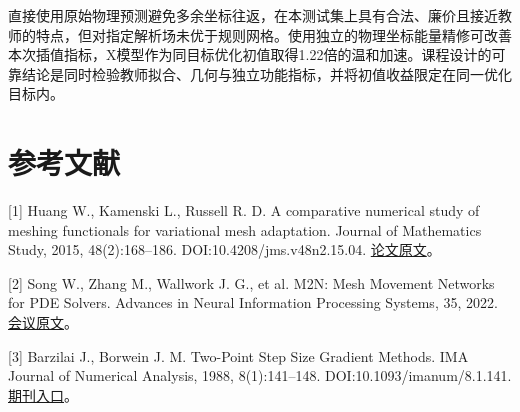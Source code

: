 \documentclass[UTF8,a4paper,zihao=5,fontset=fandol]{ctexart}
\begin{document}
直接使用原始物理预测避免多余坐标往返，在本测试集上具有合法、廉价且接近教师的特点，但对指定解析场未优于规则网格。使用独立的物理坐标能量精修可改善本次插值指标，X模型作为同目标优化初值取得1.22倍的温和加速。课程设计的可靠结论是同时检验教师拟合、几何与独立功能指标，并将初值收益限定在同一优化目标内。


\section*{参考文献}

\begin{sloppypar}[1] Huang W., Kamenski L., Russell R. D. A comparative numerical study of meshing functionals for variational mesh adaptation. Journal of Mathematics Study, 2015, 48(2):168–186. DOI:10.4208/jms.v48n2.15.04. \href{https://arxiv.org/abs/1503.04709}{论文原文}。\end{sloppypar}


\begin{sloppypar}[2] Song W., Zhang M., Wallwork J. G., et al. M2N: Mesh Movement Networks for PDE Solvers. Advances in Neural Information Processing Systems, 35, 2022. \href{https://proceedings.neurips.cc/paper\_files/paper/2022/hash/2f88d8061f12abae9d14d376fd69c933-Abstract-Conference.html}{会议原文}。\end{sloppypar}


\begin{sloppypar}[3] Barzilai J., Borwein J. M. Two-Point Step Size Gradient Methods. IMA Journal of Numerical Analysis, 1988, 8(1):141–148. DOI:10.1093/imanum/8.1.141. \href{https://doi.org/10.1093/imanum/8.1.141}{期刊入口}。\end{sloppypar}
\end{document}
